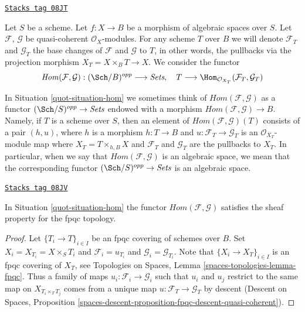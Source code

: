 \begin{definition}
\label{quot-situation-hom}
\href{https://stacks.math.columbia.edu/tag/08JT}{\texttt{Stacks tag 08JT}}

Let $S$ be a scheme. Let $f : X \to B$ be a morphism of algebraic spaces
over $S$. Let $\mathcal{F}$, $\mathcal{G}$ be quasi-coherent
$\mathcal{O}_X$-modules. For any scheme $T$ over $B$ we will denote
$\mathcal{F}_T$ and $\mathcal{G}_T$ the base changes of
$\mathcal{F}$ and $\mathcal{G}$ to $T$, in other words, the pullbacks
via the projection morphism $X_T = X \times_B T \to X$.
We consider the functor
\begin{equation}
\label{equation-hom}
\mathit{Hom}(\mathcal{F}, \mathcal{G}) :
(\Sch/B)^{opp}
\longrightarrow
\textit{Sets},\quad
T
\longrightarrow
\Hom_{\mathcal{O}_{X_T}}(\mathcal{F}_T, \mathcal{G}_T)
\end{equation}
\end{definition}

In Situation \ref{quot-situation-hom} we sometimes think of
$\mathit{Hom}(\mathcal{F}, \mathcal{G})$ as a functor
$(\Sch/S)^{opp} \to \textit{Sets}$
endowed with a morphism
$\mathit{Hom}(\mathcal{F}, \mathcal{G}) \to B$.
Namely, if $T$ is a scheme over $S$, then an element of
$\mathit{Hom}(\mathcal{F}, \mathcal{G})(T)$ consists of a pair
$(h, u)$, where $h$ is a morphism $h : T \to B$ and
$u : \mathcal{F}_T \to \mathcal{G}_T$ is an $\mathcal{O}_{X_T}$-module
map where $X_T = T \times_{h, B} X$ and $\mathcal{F}_T$ and $\mathcal{G}_T$
are the pullbacks to $X_T$. In particular, when we say
that $\mathit{Hom}(\mathcal{F}, \mathcal{G})$ is an algebraic space,
we mean that the corresponding functor
$(\Sch/S)^{opp} \to \textit{Sets}$ is an algebraic space.

\begin{lemma}
\label{quot-lemma-hom-sheaf}
\href{https://stacks.math.columbia.edu/tag/08JV}{\texttt{Stacks tag 08JV}}

In Situation \ref{quot-situation-hom} the functor
$\mathit{Hom}(\mathcal{F}, \mathcal{G})$
satisfies the sheaf property for the fpqc topology.
\end{lemma}

\begin{proof}
Let $\{T_i \to T\}_{i \in I}$ be an fpqc covering of schemes over $B$.
Set $X_i = X_{T_i} = X \times_S T_i$ and $\mathcal{F}_i = u_{T_i}$
and $\mathcal{G}_i = \mathcal{G}_{T_i}$.
Note that $\{X_i \to X_T\}_{i \in I}$ is an fpqc covering of $X_T$, see
Topologies on Spaces, Lemma \ref{spaces-topologies-lemma-fpqc}.
Thus a family of maps $u_i : \mathcal{F}_i \to \mathcal{G}_i$
such that $u_i$ and $u_j$ restrict to the same map on
$X_{T_i \times_T T_j}$ comes from a unique map
$u : \mathcal{F}_T \to \mathcal{G}_T$ by descent
(Descent on Spaces, Proposition
\ref{spaces-descent-proposition-fpqc-descent-quasi-coherent}).
\end{proof}

